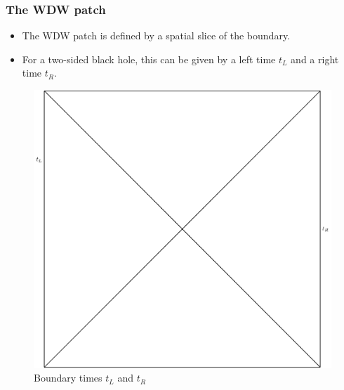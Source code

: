 \documentclass[8pt,aspectratio=169]{beamer}
\begin{document}
\begin{frame}
\frametitle{The WDW patch}

\begin{minipage}[t]{0.55\linewidth}

\begin{itemize}

\item The WDW patch is defined by a spatial slice of the boundary. 

\item For a two-sided black hole, this can be given by a left time $t_L$ and a right time $t_R$.

\end{itemize}

\end{minipage}\hfill
%
\begin{minipage}[t]{0.44\linewidth}

\begin{figure}
    \begin{center}
    
        \includegraphics[scale=0.4]{WDW0.pdf}    
    
    \end{center}
    \caption{Boundary times $t_L$ and $t_R$}
    \label{fig:WDW}
\end{figure}

\end{minipage}

\end{frame}
\end{document}
